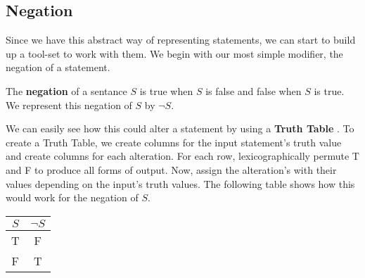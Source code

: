 \subsection{Negation}

Since we have this abstract way of representing statements, we can start to build up a tool-set to work with them.
We begin with our most simple modifier, the negation of a statement.

\begin{defn}
  \label{defn:negation}
  The \textbf{negation} of a sentance $S$ is true when $S$ is false and false when $S$ is true.
  We represent this negation of $S$ by $\neg S$.
\end{defn}


We can easily see how this could alter a statement by using a \textbf{Truth Table} .
To create a Truth Table, we create columns for the input statement's truth value and create columns for each alteration.
For each row, lexicographically permute T and F to produce all forms of output.
Now, assign the alteration's with their values depending on the input's truth values.
The following table shows how this would work for the negation of $S$.

\begin{minipage}{\linewidth}
  \centering
  \begin{tabular}{c|c}
    $S$ & $\neg S$ \\
    \hline
    T & F \\
    F & T \\
  \end{tabular}
   \label{tab:negation} 
\end{minipage}


